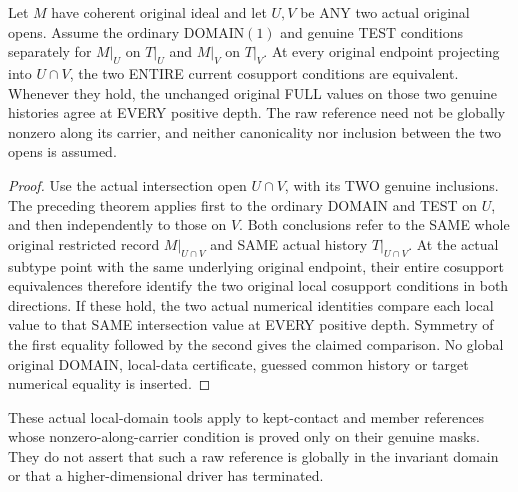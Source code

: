 \begin{theorem}
\label{hir:original-curve-two-local-domains-full-comparison}
\leanok
Let $M$ have coherent original ideal and let $U,V$ be ANY two actual
original opens. Assume the ordinary DOMAIN$(1)$ and genuine TEST
conditions separately for $M|_U$ on $T|_U$ and $M|_V$ on $T|_V$.
At every original endpoint projecting into $U\cap V$, the two ENTIRE
current cosupport conditions are equivalent. Whenever they hold, the
unchanged original FULL values on those two genuine histories agree at
EVERY positive depth. The raw reference need not be globally nonzero
along its carrier, and neither canonicality nor inclusion between the two
opens is assumed.
\end{theorem}
\begin{proof}
Use the actual intersection open $U\cap V$, with its TWO genuine
inclusions. The preceding theorem applies first to the ordinary DOMAIN
and TEST on $U$, and then independently to those on $V$. Both conclusions
refer to the SAME whole original restricted record $M|_{U\cap V}$ and
SAME actual history $T|_{U\cap V}$. At the actual subtype point with the
same underlying original endpoint, their entire cosupport equivalences
therefore identify the two original local cosupport conditions in both
directions. If these hold, the two actual numerical identities compare
each local value to that SAME intersection value at EVERY positive depth.
Symmetry of the first equality followed by the second gives the claimed
comparison. No global original DOMAIN, local-data certificate, guessed
common history or target numerical equality is inserted.
\end{proof}

These actual local-domain tools apply to kept-contact and member references
whose nonzero-along-carrier condition is proved only on their genuine
masks. They do not assert that such a raw reference is globally in the
invariant domain or that a higher-dimensional driver has terminated.

